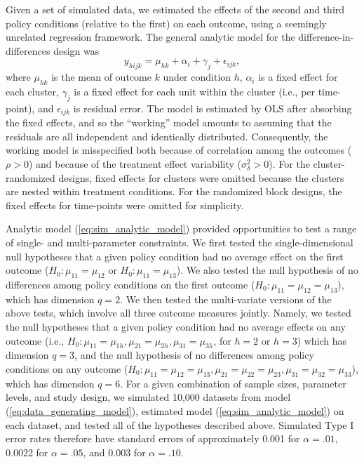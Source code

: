 \documentclass[12pt]{article}
\begin{document}
Given a set of simulated data, we estimated the effects of the second and third policy conditions (relative to the first) on each outcome, using a seemingly unrelated regression framework. 
The general analytic model for the difference-in-differences design was
\begin{equation}
\label{eq:sim_analytic_model}
y_{hijk} = \mu_{hk} + \alpha_i + \gamma_j + \epsilon_{ijk},
\end{equation}
where $\mu_{hk}$ is the mean of outcome $k$ under condition $h$, $\alpha_i$ is a fixed effect for each cluster, $\gamma_j$ is a fixed effect for each unit within the cluster (i.e., per time-point), and $\epsilon_{ijk}$ is residual error. 
The model is estimated by OLS after absorbing the fixed effects, and so the ``working'' model amounts to assuming that the residuals are all independent and identically distributed. Consequently, the working model is misspecified both because of correlation among the outcomes ($\rho > 0$) and because of the treatment effect variability ($\sigma_\delta^2 > 0$). 
For the cluster-randomized designs, fixed effects for clusters were omitted because the clusters are nested within treatment conditions. For the randomized block designs, the fixed effects for time-points were omitted for simplicity.

Analytic model (\ref{eq:sim_analytic_model}) provided opportunities to test a range of single- and multi-parameter constraints. 
We first tested the single-dimensional null hypotheses that a given policy condition had no average effect on the first outcome ($H_0: \mu_{11} = \mu_{12}$ or $H_0: \mu_{11} = \mu_{13}$). 
We also tested the null hypothesis of no differences among policy conditions on the first outcome ($H_0: \mu_{11} = \mu_{12} = \mu_{13}$), which has dimension $q = 2$. 
We then tested the multi-variate versions of the above tests, which involve all three outcome measures jointly. Namely, we tested the null hypotheses that a given policy condition had no average effects on any outcome (i.e., $H_0: \mu_{11} = \mu_{1h}, \mu_{21} = \mu_{2h}, \mu_{31} = \mu_{3h}$, for $h = 2$ or $h = 3$) which has dimension $q = 3$, and the null hypothesis of no differences among policy conditions on any outcome ($H_0: \mu_{11} = \mu_{12} = \mu_{13}, \mu_{21} = \mu_{22} = \mu_{23}, \mu_{31} = \mu_{32} = \mu_{33}$), which has dimension $q = 6$. 
For a given combination of sample sizes, parameter levels, and study design, we simulated 10,000 datasets from model (\ref{eq:data_generating_model}), estimated model (\ref{eq:sim_analytic_model}) on each dataset, and tested all of the hypotheses described above. 
Simulated Type I error rates therefore have standard errors of approximately 0.001 for $\alpha = .01$, 0.0022 for $\alpha = .05$, and 0.003 for $\alpha = .10$. 
\end{document}
